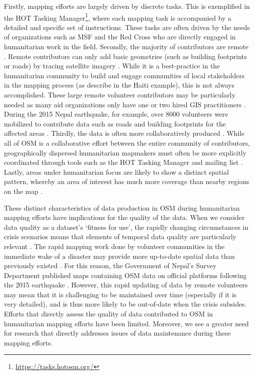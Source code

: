 Firstly, mapping efforts are largely driven by discrete tasks. This is exemplified in the HOT Tasking Manager\footnote{\url{https://tasks.hotosm.org/}}, where each mapping task is accompanied by a detailed and specific set of instructions. These tasks are often driven by the needs of organizations such as MSF and the Red Cross who are directly engaged in humanitarian work in the field. Secondly, the majority of contributors are remote \parencite{eckle_quality_2015}. Remote contributors can only add basic geometries (such as building footprints or roads) by tracing satellite imagery \parencite{vyncke_humanitarian_2015}. While it is a best-practice in the humanitarian community to build and engage communities of local stakeholders in the mapping process (as \textcite{soden_crowdsourced_2014} describe in the Haiti example), this is not always accomplished. These large remote volunteer contributors may be particularly needed as many aid organizations only have one or two hired GIS practitioners \textcite[p. 2798]{soden_infrastructure_2016}. During the 2015 Nepal earthquake, for example, over 8000 volunteers were mobilized to contribute data such as roads and building footprints for the affected areas \textcite{soden_infrastructure_2016}. Thirdly, the data is often more collaboratively produced \parencite{poiani_potential_2016}. While all of OSM is a collaborative effort between the entire community of contributors, geographically dispersed humanitarian mapmakers must often be more explicitly coordinated through tools such as the HOT Tasking Manager and mailing list \parencite{palen_success_2015}. Lastly, areas under humanitarian focus are likely to show a distinct spatial pattern, whereby an area of interest has much more coverage than nearby regions on the map \parencite{anderson_crowd_2018}. 

These distinct characteristics of data production in OSM during humanitarian mapping efforts have implications for the quality of the data. When we consider data quality as a dataset’s ‘fitness for use’, the rapidly changing circumstances in crisis scenarios means that elements of temporal data quality are particularly relevant \parencite{chen_coordination_2008}. The rapid mapping work done by volunteer communities in the immediate wake of a disaster may provide more up-to-date spatial data than previously existed \parencite{soden_crowdsourced_2014}. For this reason, the Government of Nepal’s Survey Department published maps containing OSM data on official platforms following the 2015 earthquake \parencite{soden_infrastructure_2016}. However, this rapid updating of data by remote volunteers may mean that it is challenging to be maintained over time (especially if it is very detailed), and is thus more likely to be out-of-date when the crisis subsides. Efforts that directly assess the quality of data contributed to OSM in humanitarian mapping efforts have been limited. Moreover, we see a greater need for research that directly addresses issues of data maintenance during these mapping efforts. 

